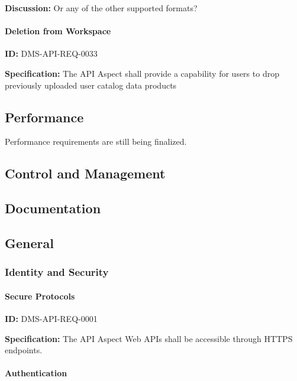 \documentclass[SE,toc,lsstdraft]{lsstdoc}
\begin{document}
\textbf{Discussion:}
Or any of the other supported formats?

\paragraph{Deletion from Workspace}\hfill  %

\label{DMS-API-REQ-0033}
\textbf{ID:} DMS-API-REQ-0033

\textbf{Specification:}
The API Aspect shall provide a capability for users to drop previously uploaded user catalog data products

\subsection{Performance}

Performance requirements are still being finalized.

\subsection{Control and Management}

\subsection{Documentation}

\subsection{General}

\subsubsection{Identity and Security}

\paragraph{Secure Protocols}\hfill  %

\label{DMS-API-REQ-0001}
\textbf{ID:} DMS-API-REQ-0001

\textbf{Specification:}
The API Aspect Web APIs shall be accessible through HTTPS endpoints.

\paragraph{Authentication}\hfill  %
\end{document}
